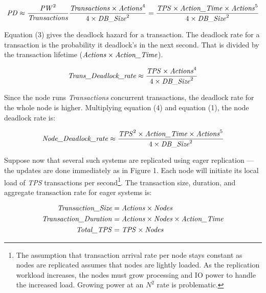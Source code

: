 \documentclass[a4paper,12pt,twoside,openright]{article}
\begin{document}
\begin{equation}
\text{\emph{PD}} \approx \frac{\text{\emph{PW}}^2}{\text{\emph{Transactions}}} \frac{\text{\emph{Transactions}} \times \text{\emph{Actions}}^4}{4 \times \text{\emph{DB\_Size}}^2}
   = \frac{\text{\emph{TPS}} \times \text{\emph{Action\_Time}} \times \text{\emph{Actions}}^5}{4 \times \text{\emph{DB\_Size}}^2}
\end{equation}

Equation (3) gives the deadlock hazard for a transaction. The deadlock
rate for a transaction is the probability it deadlock's in the next
second. That is  divided by the transaction lifetime
(\(\text{\emph{Actions}} \times \text{\emph{Action\_Time}}\)).

\begin{equation}
\text{\emph{Trans\_Deadlock\_rate}} \approx \frac{\text{\emph{TPS}} \times \text{\emph{Actions}}^4}{4 \times \text{\emph{DB\_Size}}^2}
\end{equation}

Since the node runs \emph{Transactions} concurrent transactions, the
deadlock rate for the whole node is higher. Multiplying equation (4) and
equation (1), the node deadlock rate is:

\begin{equation}
\text{\emph{Node\_Deadlock\_rate}} \approx \frac{\text{\emph{TPS}}^2 \times \text{\emph{Action\_Time}} \times \text{\emph{Actions}}^5}{4 \times \text{\emph{DB\_Size}}^2}
\end{equation}

Suppose now that several such systems are replicated using eager
replication --- the updates are done immediately as in Figure 1. Each
node will initiate its local load of \emph{TPS} transactions per
second\footnote{The assumption that transaction arrival rate per node
  stays constant as nodes are replicated assumes that nodes are lightly
  loaded. As the replication workload increases, the nodes must grow
  processing and IO power to handle the increased load. Growing power at
  an \(N^2\) rate is problematic.}. The transaction
size, duration, and aggregate transaction rate for eager systems is:

\begin{equation}
\begin{aligned}
\text{\emph{Transaction\_Size}} &= \text{\emph{Actions}} \times \text{\emph{Nodes}}\\
\text{\emph{Transaction\_Duration}} &= \text{\emph{Actions}} \times \text{\emph{Nodes}} \times \text{\emph{Action\_Time}}\\
\text{\emph{Total\_TPS}} &= \text{\emph{TPS}} \times \text{\emph{Nodes}}
\end{aligned}
\end{equation}
\end{document}
